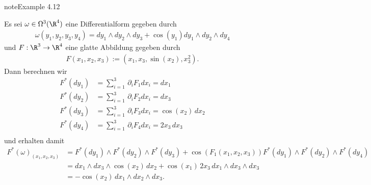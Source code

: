 \documentclass[letterpaper,10pt,german]{jupyterBook}
\begin{document}
\begin{sphinxadmonition}{note}{Example 4.12}



\sphinxAtStartPar
Es sei \(\omega\in \Omega^3(\R^4)\) eine Differentialform gegeben durch
\begin{equation*}
\begin{split}\omega(y_1,y_2,y_3,y_4) = dy_1\wedge dy_2\wedge dy_3 + \cos(y_1)dy_1\wedge dy_2 \wedge dy_4\end{split}
\end{equation*}
\sphinxAtStartPar
und \(F:\R^3\to\R^4\) eine glatte Abbildung gegeben durch
\begin{equation*}
\begin{split}F(x_1,x_2,x_3) := (x_1, x_3, \sin(x_2), x_3^2).\end{split}
\end{equation*}
\sphinxAtStartPar
Dann berechnen wir
\begin{equation*}
\begin{split}F^\ast(dy_1) &= \sum_{i=1}^3 \,\partial_i F_1 dx_i = dx_1\\
F^\ast(dy_2) &= \sum_{i=1}^3 \,\partial_i F_2 dx_i = dx_3\\
F^\ast(dy_3) &= \sum_{i=1}^3 \,\partial_i F_3 dx_i = \cos(x_2)\,dx_2\\
F^\ast(dy_4) &= \sum_{i=1}^3 \,\partial_i F_4 dx_i = 2x_3\,dx_3\\\end{split}
\end{equation*}
\sphinxAtStartPar
und erhalten damit
\begin{equation*}
\begin{split}F^\ast(\omega)_{(x_1,x_2,x_3)} &= F^\ast(dy_1)\wedge F^\ast(dy_2)\wedge F^\ast(dy_3) + 
\cos(F_1(x_1,x_2,x_3)) F^\ast(dy_1)\wedge F^\ast(dy_2)\wedge F^\ast(dy_4)\\
&= dx_1 \wedge dx_3\wedge \cos(x_2)\,dx_2 + \cos(x_1)\, 2x_3\,dx_1\wedge dx_3\wedge dx_3\\
&=  -\cos(x_2)\,dx_1 \wedge dx_2\wedge dx_3.\end{split}
\end{equation*}\end{sphinxadmonition}
\end{document}
